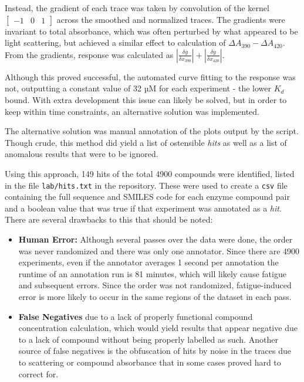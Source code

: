 \documentclass[16pt]{book}
\begin{document}
Instead, the gradient of each trace was taken by convolution of the kernel $\begin{bmatrix} -1 & 0 & 1 \end{bmatrix}$ across the smoothed and normalized traces.
The gradients were invariant to total absorbance, which was often perturbed by what appeared to be light scattering, but achieved a similar effect to calculation of $\Delta A_{390} - \Delta A_{420}$.
From the gradients, response was calculated as $|{\frac{\delta y}{\delta x_{390}}}| + |{\frac{\delta y}{\delta x_{420}}}|$.

Although this proved successful, the automated curve fitting to the response was not, outputting a constant value of 32 µM for each experiment - the lower $K_d$ bound.
With extra development this issue can likely be solved, but in order to keep within time constraints, an alternative solution was implemented.


The alternative solution was manual annotation of the plots output by the script.
Though crude, this method did yield a list of ostensible \textit{hits} as well as a list of anomalous results that were to be ignored.

Using this approach, 149 hits of the total 4900 compounds were identified, listed in the file \texttt{lab/hits.txt} in the repository.
These were used to create a \texttt{csv} file containing the full sequence and SMILES code for each enzyme compound pair and a boolean value that was true if that experiment was annotated as a \textit{hit}.
There are several drawbacks to this that should be noted:

\begin{itemize}
	\item \textbf{Human Error:} Although several passes over the data were done, the order was never randomized and there was only one annotator. 
		Since there are 4900 experiments, even if the annotator averages 1 second per annotation the runtime of an annotation run is 81 minutes, which will likely cause fatigue and subsequent errors.
		Since the order was not randomized, fatigue-induced error is more likely to occur in the same regions of the dataset in each pass.
	\item \textbf{False Negatives} due to a lack of properly functional compound concentration calculation, which would yield results that appear negative due to a lack of compound without being properly labelled as such.
		Another source of false negatives is the obfuscation of hits by noise in the traces due to scattering or compound absorbance that in some cases proved hard to correct for.
\end{itemize}
\end{document}
